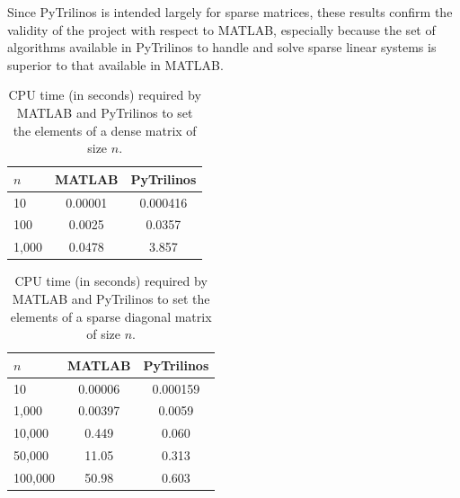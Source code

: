 \documentclass[acmtocl]{acmtrans2m}
\begin{document}
Since PyTrilinos is intended largely
for sparse matrices, these results confirm the validity of the project
with respect to MATLAB, especially because the set of algorithms
available in PyTrilinos to handle and solve sparse linear systems is
superior to that available in MATLAB.

\begin{table}
  \begin{center}
    \begin{tabular}{| l | c | c |}
      \hline
      $n$ & MATLAB & PyTrilinos \\
      \hline
      \hline
      10     & 0.00001 & 0.000416 \\
      100    & 0.0025 & 0.0357    \\
      1,000  & 0.0478 & 3.857     \\
      \hline
    \end{tabular}
    \caption{CPU time (in seconds) required by MATLAB and PyTrilinos
      to set the elements of a dense matrix of size $n$.}
    \label{tab:matlab_dense}
  \end{center}
\end{table}

\begin{table}
  \begin{center}
    \begin{tabular}{| l | c | c |}
      \hline
      $n$ & MATLAB & PyTrilinos \\
      \hline
      \hline
      10      & 0.00006 & 0.000159 \\
      1,000   & 0.00397 & 0.0059   \\
      10,000  & 0.449   & 0.060    \\
      50,000  & 11.05   & 0.313    \\
      100,000 & 50.98   & 0.603    \\
      \hline
    \end{tabular}
    \caption{CPU time (in seconds) required by MATLAB and PyTrilinos
      to set the elements of a sparse diagonal matrix of size $n$.}
    \label{tab:matlab_sparse}
  \end{center}
\end{table}
\end{document}
